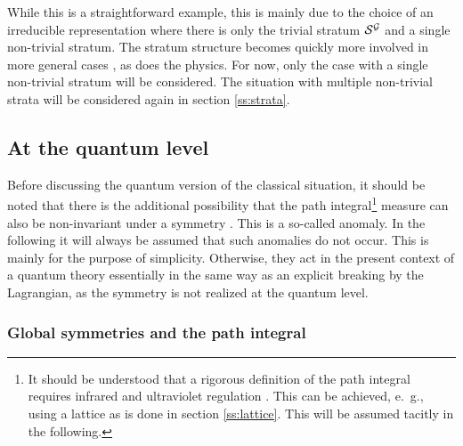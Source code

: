 \documentclass[final,twoside,12pt]{article}
\newcommand*{\1}{1\!\!\!\bot}
\begin{document}
While this is a straightforward example, this is mainly due to the choice of an irreducible representation where there is only the trivial stratum ${\cal S}^{\cal G}$ and a single non-trivial stratum. The stratum structure becomes quickly more involved in more general cases \cite{O'Raifeartaigh:1978kv}, as does the physics. For now, only the case with a single non-trivial stratum will be considered. The situation with multiple non-trivial strata will be considered again in section \ref{ss:strata}.

\subsection{At the quantum level}\label{s:hidssb}

Before discussing the quantum version of the classical situation, it should be noted that there is the additional possibility that the path integral\footnote{It should be understood that a rigorous definition of the path integral requires infrared and ultraviolet regulation \cite{Seiler:1982pw,Rivers:1987hi}. This can be achieved, e.\ g., using a lattice as is done in section \ref{ss:lattice}. This will be assumed tacitly in the following.} measure can also be non-invariant under a symmetry \cite{Bohm:2001yx,Bertlmann:1996xk}. This is a so-called anomaly. In the following it will always be assumed that such anomalies do not occur. This is mainly for the purpose of simplicity. Otherwise, they act in the present context of a quantum theory essentially in the same way as an explicit breaking by the Lagrangian, as the symmetry is not realized at the quantum level.

\subsubsection{Global symmetries and the path integral}\label{sss:metastable}
\end{document}
